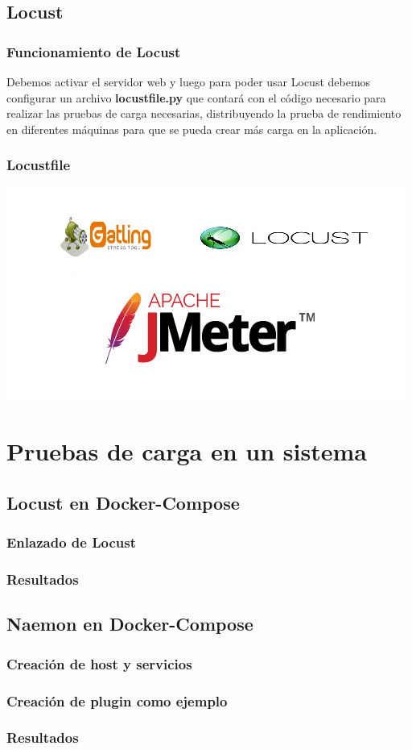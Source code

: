 \documentclass{beamer}
\theoremstyle{plain}
\theoremstyle{definition}
\theoremstyle{plain}
\theoremstyle{definition}
\theoremstyle{remark}
\theoremstyle{definition}
\begin{document}
\subsection{Locust}
\begin{frame}
	\frametitle{Funcionamiento de Locust}
	Debemos activar el servidor web y luego para poder usar Locust debemos configurar un archivo \textbf{locustfile.py} que contará con el código necesario para realizar las pruebas de carga necesarias, distribuyendo la prueba de rendimiento en diferentes máquinas para que se
	pueda crear más carga en la aplicación.
	
\end{frame}
\begin{frame}
	\frametitle{Locustfile}
	\centering
	\includegraphics[scale=0.8]{imagenes/comparativaHerramientasPrueba.png}
\end{frame}
\section{Pruebas de carga en un sistema} %


\subsection{Locust en Docker-Compose}
\begin{frame}
	\frametitle{Enlazado de Locust}
	
\end{frame}
\begin{frame}
	\frametitle{Resultados}
	\end{frame}
\subsection{Naemon en Docker-Compose}
\begin{frame}
	\frametitle{Creación de host y servicios}
	
\end{frame}
\begin{frame}
	\frametitle{Creación de plugin como ejemplo}
	
\end{frame}
\begin{frame}
	\frametitle{Resultados}
	\end{frame}
\end{document}
